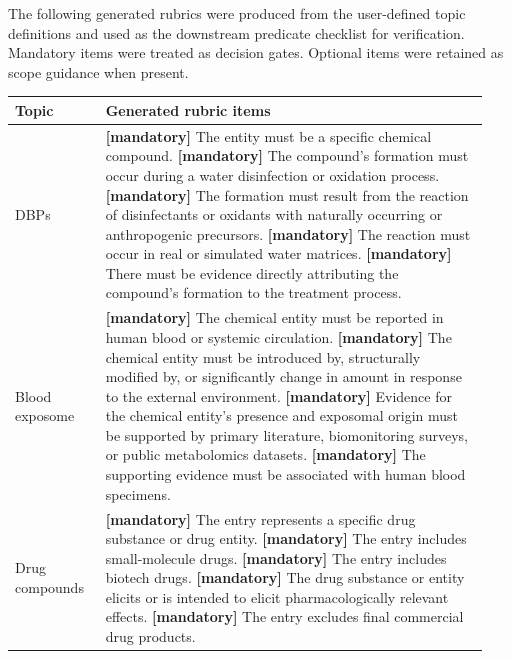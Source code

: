 \documentclass[10pt]{article}
\begin{document}
The following generated rubrics were produced from the user-defined topic definitions and used as the downstream predicate checklist for verification. Mandatory items were treated as decision gates. Optional items were retained as scope guidance when present.

\begin{longtable}{p{0.18\linewidth}p{0.76\linewidth}}
\toprule
Topic & Generated rubric items \\
\midrule
DBPs &
\textbf{[mandatory]} The entity must be a specific chemical compound.\newline
\textbf{[mandatory]} The compound's formation must occur during a water disinfection or oxidation process.\newline
\textbf{[mandatory]} The formation must result from the reaction of disinfectants or oxidants with naturally occurring or anthropogenic precursors.\newline
\textbf{[mandatory]} The reaction must occur in real or simulated water matrices.\newline
\textbf{[mandatory]} There must be evidence directly attributing the compound's formation to the treatment process.
\\
Blood exposome &
\textbf{[mandatory]} The chemical entity must be reported in human blood or systemic circulation.\newline
\textbf{[mandatory]} The chemical entity must be introduced by, structurally modified by, or significantly change in amount in response to the external environment.\newline
\textbf{[mandatory]} Evidence for the chemical entity's presence and exposomal origin must be supported by primary literature, biomonitoring surveys, or public metabolomics datasets.\newline
\textbf{[mandatory]} The supporting evidence must be associated with human blood specimens.
\\
Drug compounds &
\textbf{[mandatory]} The entry represents a specific drug substance or drug entity.\newline
\textbf{[mandatory]} The entry includes small-molecule drugs.\newline
\textbf{[mandatory]} The entry includes biotech drugs.\newline
\textbf{[mandatory]} The drug substance or entity elicits or is intended to elicit pharmacologically relevant effects.\newline
\textbf{[mandatory]} The entry excludes final commercial drug products.\newline

\end{longtable}
\end{document}
